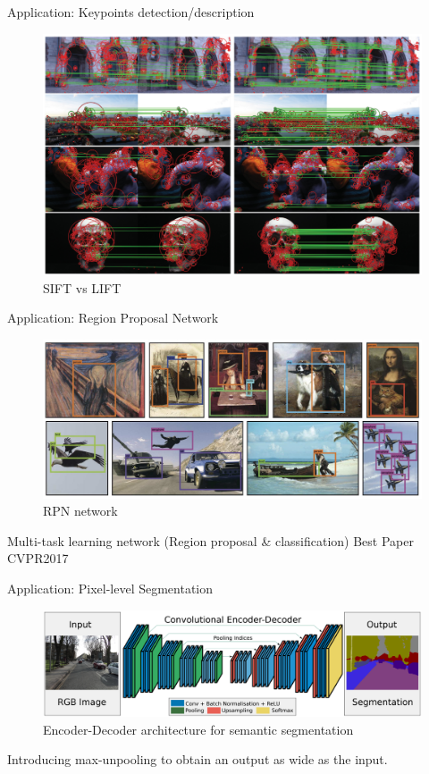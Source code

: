 \begin{frame}{Application: Keypoints detection/description}

	\begin{figure}
		\includegraphics[width=0.8\linewidth]{images/lift.png}
		\caption{SIFT vs LIFT}
	\end{figure}
	
	
	\cite{LIFT}
\end{frame}

\begin{frame}{Application: Region Proposal Network}

	\begin{figure}
		\includegraphics[width=\linewidth]{images/yolo.png}
		\caption{RPN network}
	\end{figure}
	
	Multi-task learning network (Region proposal \& classification)
	Best Paper CVPR2017~\cite{YOLO9000}
	
	\cite{YOLO,FASTRCNN,FASTERRCNN}
\end{frame}

\begin{frame}{Application: Pixel-level Segmentation}

	\begin{figure}
		\includegraphics[width=\linewidth]{images/segnet.png}
		\caption{Encoder-Decoder architecture for semantic segmentation}
	\end{figure}
	
	Introducing max-unpooling to obtain an output as wide as the input.
	
	\cite{SEGNET}
\end{frame}

